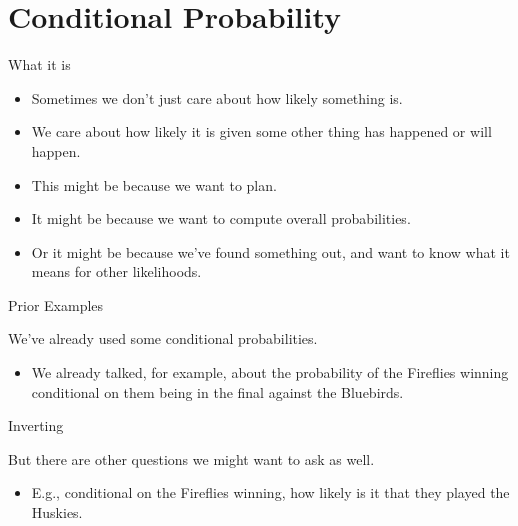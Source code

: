 \documentclass[
  ignorenonframetext,
]{beamer}
\providecommand{\tightlist}{%
  \setlength{\itemsep}{0pt}\setlength{\parskip}{0pt}}
\renewcommand{\,}{\text{, }}
\begin{document}
\hypertarget{conditional-probability}{%
\section{Conditional Probability}\label{conditional-probability}}

\begin{frame}{What it is}
\protect\hypertarget{what-it-is}{}

\begin{itemize}
\tightlist
\item
  Sometimes we don't just care about how likely something is.
\item
  We care about how likely it is given some other thing has happened or
  will happen. \pause
\item
  This might be because we want to plan. \pause
\item
  It might be because we want to compute overall probabilities. \pause
\item
  Or it might be because we've found something out, and want to know
  what it means for other likelihoods.
\end{itemize}

\end{frame}

\begin{frame}{Prior Examples}
\protect\hypertarget{prior-examples}{}

We've already used some conditional probabilities.

\begin{itemize}
\tightlist
\item
  We already talked, for example, about the probability of the Fireflies
  winning conditional on them being in the final against the Bluebirds.
\end{itemize}

\end{frame}

\begin{frame}{Inverting}
\protect\hypertarget{inverting}{}

But there are other questions we might want to ask as well.

\begin{itemize}[<+->]
\tightlist
\item
  E.g., conditional on the Fireflies winning, how likely is it that they
  played the Huskies.
\end{itemize}

\end{frame}
\end{document}
